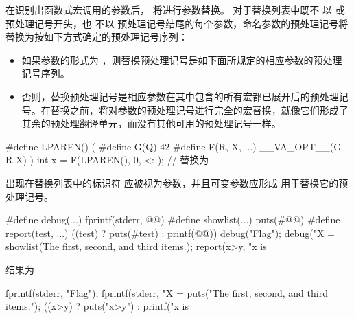     \pnum
    在识别出函数式宏调用的参数后，
    将进行参数替换。
    对于替换列表中既不
    以 \tcode{\#} 或 \tcode{\#\#} 预处理记号开头，也
    不以 \tcode{\#\#} 预处理记号结尾的每个参数，命名参数的预处理记号将替换为按如下方式确定的预处理记号序列：
    \begin{itemize}
    \item
    如果参数的形式为 ，则替换预处理记号是如下面所规定的相应参数的预处理记号序列。
    \item
    否则，替换预处理记号是相应参数在其中包含的所有宏都已展开后的预处理记号。在替换之前，将对参数的预处理记号进行完全的宏替换，就像它们形成了其余的预处理翻译单元，而没有其他可用的预处理记号一样。
    \end{itemize}
    \begin{example}
    \begin{codeblock}
    #define LPAREN() (
    #define G(Q) 42
    #define F(R, X, ...)  __VA_OPT__(G R X) )
    int x = F(LPAREN(), 0, <:-);    // 替换为 
    \end{codeblock}
    \end{example}
    
    \pnum
    出现在替换列表中的标识符 
    应被视为参数，并且可变参数应形成
    用于替换它的预处理记号。
    
    \pnum
    \begin{example}
    \begin{codeblock}
    #define debug(...) fprintf(stderr, @@)
    #define showlist(...) puts(#@@)
    #define report(test, ...) ((test) ? puts(#test) : printf(@@))
    debug("Flag");
    debug("X = %
    showlist(The first, second, and third items.);
    report(x>y, "x is %
    \end{codeblock}
    结果为
    \begin{codeblock}
    fprintf(stderr, "Flag");
    fprintf(stderr, "X = %
    puts("The first, second, and third items.");
    ((x>y) ? puts("x>y") : printf("x is %
    \end{codeblock}
    \end{example}
    
